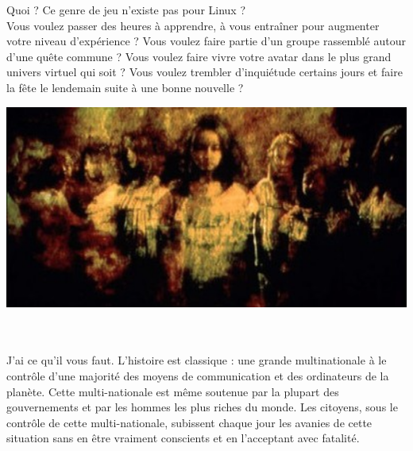 \documentclass[11pt,twoside,a4paper]{article}
\begin{document}
\begin{minipage}[ht]{0.30\textwidth}
	Quoi ? Ce genre de jeu n'existe pas pour Linux ?~\\
	Vous voulez passer des heures {\`a} apprendre, {\`a} vous entra{\^i}ner pour augmenter votre niveau d'exp{\'e}rience ? Vous voulez faire partie d'un groupe rassembl{\'e} autour d'une qu{\^e}te commune ? Vous voulez faire vivre votre avatar dans le plus grand univers virtuel qui soit ? Vous voulez trembler d'inqui{\'e}tude certains jours et faire la f{\^e}te le lendemain suite {\`a} une bonne nouvelle ?~\\
\end{minipage} \hfill \begin{minipage}[ht]{14.10cm}
	\includegraphics[width=14.05cm]{img/avalon_sisters.jpg}
\end{minipage}~\\~\\

J'ai ce qu'il vous faut. L'histoire est classique : une grande multinationale {\`a} le contr{\^o}le d'une majorit{\'e} des moyens de communication et des ordinateurs de la plan{\`e}te. Cette multi-nationale est m{\^e}me soutenue par la plupart des gouvernements et par les hommes les plus riches du monde. Les citoyens, sous le contr{\^o}le de cette multi-nationale, subissent chaque jour les avanies de cette situation sans en {\^e}tre vraiment conscients et en l'acceptant avec fatalit{\'e}.~\\
\end{document}
